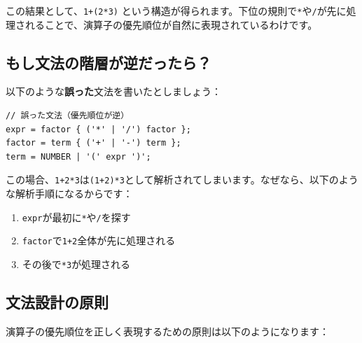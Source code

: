この結果として、\texttt{1+(2*3)}
という構造が得られます。下位の規則で\texttt{*}や\texttt{/}が先に処理されることで、演算子の優先順位が自然に表現されているわけです。

\begin{center}
\end{center}

\hypertarget{chapter2-ux3082ux3057ux6587ux6cd5ux306eux968eux5c64ux304cux9006ux3060ux3063ux305fux3089}{%
\subsection{もし文法の階層が逆だったら？}\label{chapter2-ux3082ux3057ux6587ux6cd5ux306eux968eux5c64ux304cux9006ux3060ux3063ux305fux3089}}

以下のような\textbf{誤った}文法を書いたとしましょう：

\begin{verbatim}
// 誤った文法（優先順位が逆）
expr = factor { ('*' | '/') factor };
factor = term { ('+' | '-') term };
term = NUMBER | '(' expr ')';
\end{verbatim}

この場合、\texttt{1+2*3}は\texttt{(1+2)*3}として解析されてしまいます。なぜなら、以下のような解析手順になるからです：

\begin{enumerate}
\def\labelenumi{\arabic{enumi}.}
\tightlist
\item
  \texttt{expr}が最初に\texttt{*}や\texttt{/}を探す
\item
  \texttt{factor}で\texttt{1+2}全体が先に処理される
\item
  その後で\texttt{*3}が処理される
\end{enumerate}

\hypertarget{chapter2-ux6587ux6cd5ux8a2dux8a08ux306eux539fux5247}{%
\subsection{文法設計の原則}\label{chapter2-ux6587ux6cd5ux8a2dux8a08ux306eux539fux5247}}

演算子の優先順位を正しく表現するための原則は以下のようになります：

